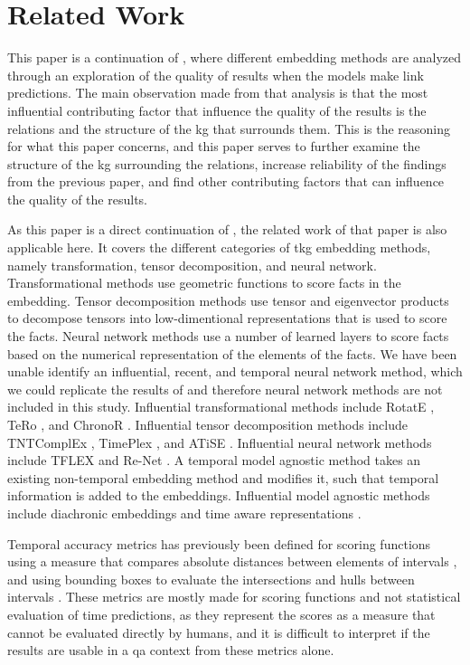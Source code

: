 \section{Related Work}
\label{sec:related-work}

This paper is a continuation of \cite{P9}, where different embedding methods are analyzed through an exploration of the quality of results when the models make link predictions. The main observation made from that analysis is that the most influential contributing factor that influence the quality of the results is the relations and the structure of the \gls{kg} that surrounds them. This is the reasoning for what this paper concerns, and this paper serves to further examine the structure of the \gls{kg} surrounding the relations, increase reliability of the findings from the previous paper, and find other contributing factors that can influence the quality of the results.

As this paper is a direct continuation of \cite{P9}, the related work of that paper is also applicable here.
It covers the different categories of \gls{tkg} embedding methods, namely transformation, tensor decomposition, and neural network. 
Transformational methods use geometric functions to score facts in the embedding.
Tensor decomposition methods use tensor and eigenvector products to decompose tensors into low-dimentional representations that is used to score the facts.
Neural network methods use a number of learned layers to score facts based on the numerical representation of the elements of the facts.
We have been unable identify an influential, recent, and temporal neural network method, which we could replicate the results of and therefore neural network methods are not included in this study.
Influential transformational methods include RotatE \cite{sun2019rotate}, TeRo \cite{xu2020tero}, and ChronoR \cite{sadeighan2021chronor}. Influential tensor decomposition methods include TNTComplEx \cite{lacroix2020tcomplex}, TimePlex \cite{jain2020timeplex}, and ATiSE \cite{xu19atise}. 
Influential neural network methods include TFLEX \cite{lin22tflex} and Re-Net \cite{jin2019renet}.
A temporal model agnostic method takes an existing non-temporal embedding method and modifies it, such that temporal information is added to the embeddings.
Influential model agnostic methods include diachronic embeddings \cite{goel19diachronicemb} and time aware representations \cite{garcia-duran2018ta}.

Temporal accuracy metrics has previously been defined for scoring functions using a measure that compares absolute distances between elements of intervals \cite{surdeanu2013overviewtac}, and using bounding boxes to evaluate the intersections and hulls between intervals \cite{jain2020timeplex}. These metrics are mostly made for scoring functions and not statistical evaluation of time predictions, as they represent the scores as a measure that cannot be evaluated directly by humans, and it is difficult to interpret if the results are usable in a \gls{qa} context from these metrics alone.

